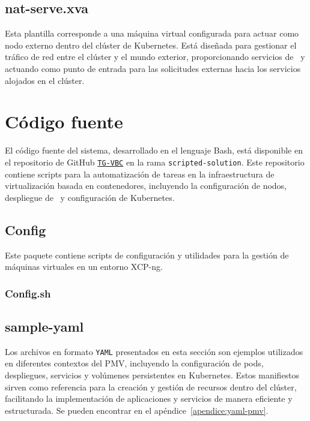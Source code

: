 \subsection{nat-serve.xva}
\noindent
Esta plantilla corresponde a una máquina virtual configurada para actuar como nodo externo dentro del clúster de Kubernetes. Está diseñada para gestionar el tráfico de red entre el clúster y el mundo exterior, proporcionando servicios de \NAT\ y actuando como punto de entrada para las solicitudes externas hacia los servicios alojados en el clúster.

\section{Código fuente}\label{sec:automatizacion-scripts}
\noindent
El código fuente del sistema, desarrollado en el lenguaje Bash, está disponible en el repositorio de GitHub \href{https://github.com/AariazP/TG-VBC.git}{\texttt{TG-VBC}} en la rama \texttt{scripted-solution}. Este repositorio contiene scripts para la automatización de tareas en la infraestructura de virtualización basada en contenedores, incluyendo la configuración de nodos, despliegue de \VM\ y configuración de Kubernetes.

\subsection{Config}
\noindent
Este paquete contiene scripts de configuración y utilidades para la gestión de máquinas virtuales en un entorno XCP-ng.
\subsubsection{Config.sh}
\noindent



\subsection{sample-yaml}
\noindent
Los archivos en formato \texttt{YAML} presentados en esta sección son ejemplos utilizados en diferentes contextos del PMV, incluyendo la configuración de pods, despliegues, servicios y volúmenes persistentes en Kubernetes. Estos manifiestos sirven como referencia para la creación y gestión de recursos dentro del clúster, facilitando la implementación de aplicaciones y servicios de manera eficiente y estructurada.
Se pueden encontrar en el apéndice~\ref{apendice:yaml-pmv}.


